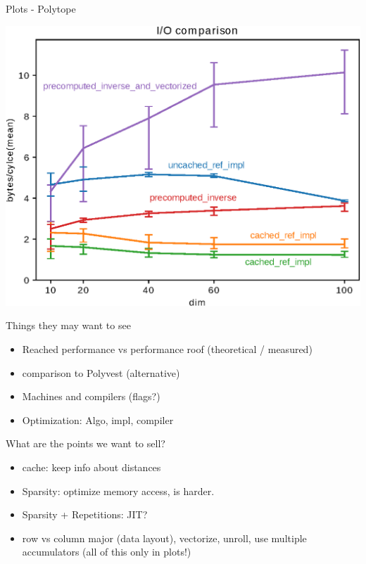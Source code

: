 \documentclass[table]{beamer}
\begin{document}
\begin{frame}{Plots - Polytope}
	\begin{center}
	    \includegraphics[scale=0.7]{plots/polytopeT_intersectCoord_io_mean_labeled.eps}
	\end{center}
\end{frame}

\begin{frame}{Things they may want to see}
	\begin{itemize}
	    \item Reached performance vs performance roof (theoretical / measured)
		\item comparison to Polyvest (alternative)
		\item Machines and compilers (flags?)
		\item Optimization: Algo, impl, compiler
	\end{itemize}
\end{frame}

\begin{frame}{What are the points we want to sell?}
	\begin{itemize}
	    \item cache: keep info about distances
	    \item Sparsity: optimize memory access, is harder.
	    \item Sparsity + Repetitions: JIT?
	    \item row vs column major (data layout), vectorize, unroll, use multiple accumulators (all of this only in plots!)
	\end{itemize}
\end{frame}
\end{document}

